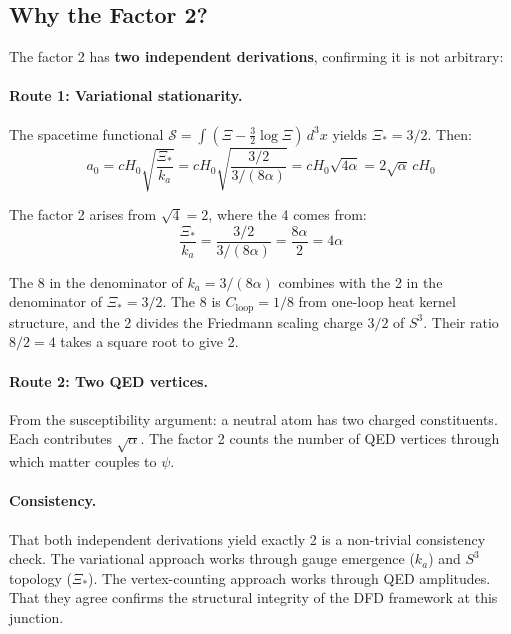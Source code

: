 \documentclass[12pt,a4paper]{article}
\newcommand{\Hzero}{H_0}
\begin{document}
\subsection{Why the Factor 2?}
\label{sec:why-factor-2}

The factor 2 has \textbf{two independent derivations}, confirming it is not
arbitrary:

\paragraph{Route 1: Variational stationarity.}
The spacetime functional $\mathcal{S} = \int(\Xi - \frac{3}{2}\log\Xi)\,d^3x$
yields $\Xi_* = 3/2$. Then:
\begin{equation}
a_0 = c\Hzero\sqrt{\frac{\Xi_*}{k_a}}
= c\Hzero\sqrt{\frac{3/2}{3/(8\alpha)}}
= c\Hzero\sqrt{4\alpha}
= 2\sqrt{\alpha}\,c\Hzero
\end{equation}

The factor 2 arises from $\sqrt{4} = 2$, where the 4 comes from:
\begin{equation}
\frac{\Xi_*}{k_a} = \frac{3/2}{3/(8\alpha)} = \frac{8\alpha}{2} = 4\alpha
\end{equation}

The 8 in the denominator of $k_a = 3/(8\alpha)$ combines with the 2 in
the denominator of $\Xi_* = 3/2$. The 8 is $C_{\mathrm{loop}} = 1/8$
from one-loop heat kernel structure, and the 2 divides the Friedmann
scaling charge $3/2$ of $S^3$. Their ratio $8/2 = 4$ takes a square root
to give 2.

\paragraph{Route 2: Two QED vertices.}
From the susceptibility argument: a neutral atom has two charged
constituents. Each contributes $\sqrt{\alpha}$. The factor 2 counts the
number of QED vertices through which matter couples to $\psi$.

\paragraph{Consistency.}
That both independent derivations yield exactly 2 is a non-trivial
consistency check. The variational approach works through gauge emergence
($k_a$) and $S^3$ topology ($\Xi_*$). The vertex-counting approach works
through QED amplitudes. That they agree confirms the structural integrity
of the DFD framework at this junction.
\end{document}
